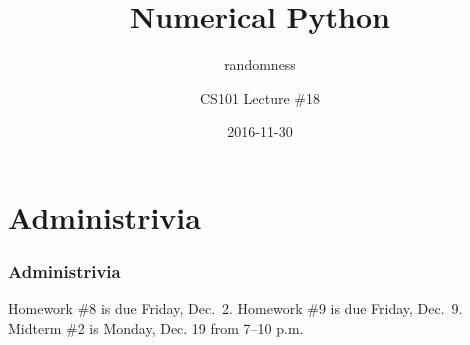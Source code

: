 \documentclass[11pt]{beamer}
\title{Numerical Python}
\subtitle{randomness}
\author{CS101 Lecture \#18}
\date{2016-11-30}
\begin{document}
  \setcounter{showProgressBar}{0}
  \setcounter{showSlideNumbers}{0}

\frame{\titlepage}

\setcounter{framenumber}{0}
\setcounter{showProgressBar}{1}
\setcounter{showSlideNumbers}{1}

\section{Administrivia}

\begin{frame}
  \frametitle{Administrivia}
  \Enlarge

  \begin{itemize}
  	\myitem  Homework \#8 is due Friday, Dec.\ 2.
  	\myitem  Homework \#9 is due Friday, Dec.\ 9.
  	\myitem  Midterm \#2 is Monday, Dec. 19 from 7–10 p.m.
  \end{itemize}
\end{frame}
\end{document}
